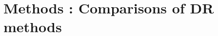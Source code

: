 \documentclass[compress]{beamer}
\begin{document}
\begin{frame}
\begin{overprint}
\begin{columns}[t]
\begin{column}{0.5\linewidth}
  \end{column}
 \end{columns} 
  

  
  
\end{overprint}

  \begin{flushright}
\color{IARCdblue}{ \scriptsize{\insertframenumber / \inserttotalframenumber}} \hspace*{2mm}
  \end{flushright}

\end{frame}





\section{Methods : Comparisons of DR methods}
\end{document}
